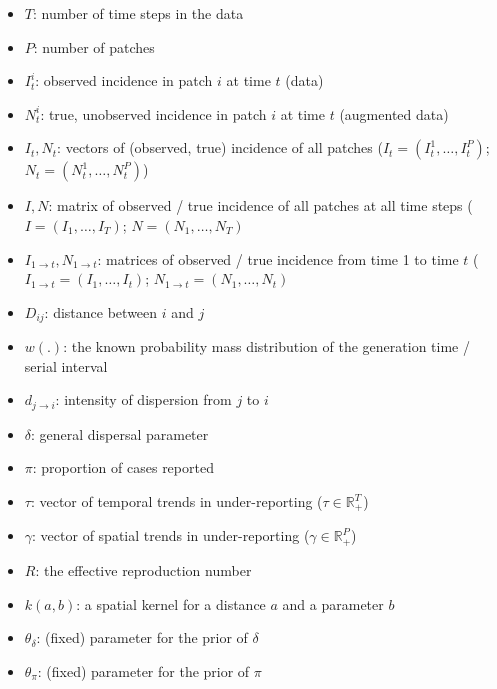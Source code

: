 \documentclass[a4paper,11pt]{article}
\newcommand{\R}{\mathbb{R}}
\begin{document}
\begin{itemize}
 \item $T$: number of time steps in the data
 \item $P$: number of patches
 \item $I_t^i$: observed incidence in patch $i$ at time $t$ (data)
 \item $N_t^i$: true, unobserved incidence in patch $i$ at time $t$ (augmented 
data)
 \item $I_t, N_t$: vectors of (observed, true) incidence of all patches 
 ($I_t = (I_t^1, \ldots, I_t^P)$; $N_t = (N_t^1, \ldots, N_t^P)$)
 \item $I,N$: matrix of observed / true incidence of all patches at all time 
steps ($I = (I_1, \ldots, I_T)$; $N = (N_1, \ldots, N_T)$
 \item $I_{1 \rightarrow t}, N_{1 \rightarrow t}$: matrices of observed / true 
incidence from time 1 to time $t$ 
($I_{1 \rightarrow t} = (I_1, \ldots, I_t)$; $N_{1 \rightarrow t} = (N_1, 
\ldots, N_t)$
 \item $D_{ij}$: distance between $i$ and $j$
 \item $w(.)$: the known probability mass distribution of the generation time / serial interval
 \item $d_{j\rightarrow i}$: intensity of dispersion from $j$ to $i$
 \item $\delta$: general dispersal parameter
 \item $\pi$: proportion of cases reported
 \item $\tau$: vector of temporal trends in under-reporting ($\tau \in \R_+^T$)
 \item $\gamma$: vector of spatial trends in under-reporting ($\gamma \in \R_+^P$)
 \item $R$: the effective reproduction 
number
 \item $k(a,b)$: a spatial kernel for a distance $a$ and a parameter $b$
 \item $\theta_{\delta}$: (fixed) parameter for the prior of 
$\delta$
 \item $\theta_{\pi}$: (fixed) parameter for the prior of $\pi$
\end{itemize}
\end{document}

